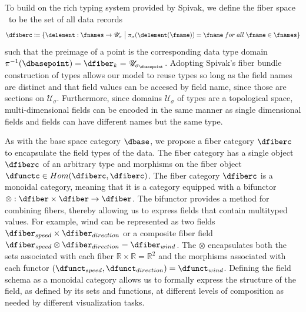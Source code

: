 \documentclass[10pt,journal,compsoc]{IEEEtran}
\theoremstyle{definition}
\theoremstyle{remark}
\begin{document}
To build on the rich typing system provided by Spivak, we define the \textcolor{fiber}{fiber space} \dfiberc\ to be the set of all data records
\begin{equation}
  \dfiberc \coloneqq \{\delement: \fnames \rightarrow \mathscr{U}_{\sigma} \bigm{\vert} \pi_{\sigma}(\delement(\fname)) = \fname\;for\;all\; \fname \in \fnames \}
\end{equation}
such that the preimage of a point is the corresponding data type domain $\pi^{-1}(\dbasepoint) = \dfiber_{k} = \mathscr{U}_{{\sigma}_{\dbasepoint}}$. 
Adopting Spivak's fiber bundle construction of types allows our model to reuse types so long as the field names are distinct and that field values can be accesed by field name,  since those are sections on $\mathcal{U}_{\sigma}$. Furthermore, since domains $\mathscr{U}_{{\sigma}}$ of types are a topological space, multi-dimensional fields can be encoded in the same manner as single dimensional fields and fields can have different names but the same type. 

As with the base space category $\mathcal{\dbase}$, we propose a fiber category $\mathcal{\dfiberc}$ to encapsulate the field types of the data. The fiber category has a single object $\dfiberc$ of an arbitrary type and morphisms on the fiber object $\dfunctc \in Hom(\dfiberc, \dfiberc)$. The fiber category $\mathcal{\dfiberc}$ is a monoidal category, meaning that it is a category equipped with a bifunctor $\otimes: \mathcal{\dfiber} \times \mathcal{\dfiber} \rightarrow \mathcal{\dfiber}$. The bifunctor provides a method for combining fibers, thereby allowing us to express fields that contain multityped values. For example, wind can be represented as two fields $\dfiber_{speed} \times \dfiber_{direction}$ or a composite fiber field $\dfiber_{speed} \otimes \dfiber_{direction} = \dfiber_{wind}$. The $\otimes$ encapsulates both the sets associated with each fiber $\mathbb{R} \times \mathbb{R} = \mathbb{R}^{2}$ and the morphisms associated with each functor $(\dfunct_{speed}, \dfunct_{direction}) = \dfunct_{wind}$. Defining the field schema as a monoidal category allows us to formally express the structure of the field, as defined by its sets and functions, at different levels of composition as needed by different visualization tasks.
 
\end{document}
